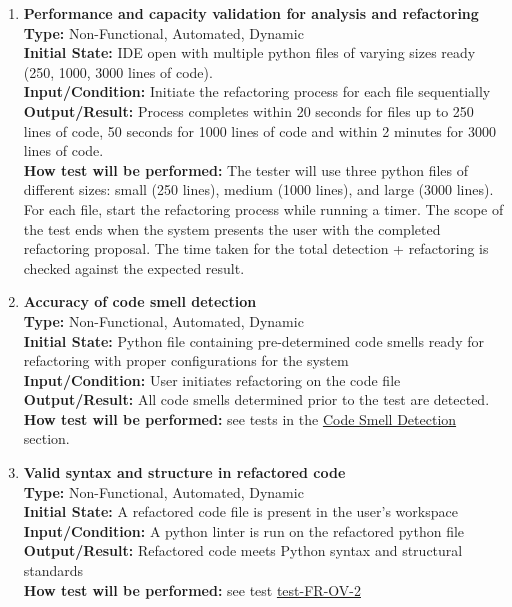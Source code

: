 \documentclass[12pt, titlepage]{article}
\begin{document}
\begin{enumerate}[label={\bf \textcolor{Maroon}{test-PF-\arabic*}}, wide=0pt, font=\itshape]
  \item \textbf{Performance and capacity validation for analysis and refactoring} \\[2mm]
    \textbf{Type:} Non-Functional, Automated, Dynamic \\
    \textbf{Initial State:} IDE open with multiple python files of varying sizes ready (250, 1000, 3000 lines of code). \\
    \textbf{Input/Condition:} Initiate the refactoring process for each file sequentially \\
    \textbf{Output/Result:} Process completes within 20 seconds for files up to 250 lines of code, 50 seconds for 1000 lines of code and within 2 minutes for 3000 lines of code. \\[2mm]
    \textbf{How test will be performed:} The tester will use three python files of different sizes: small (250 lines), medium (1000 lines), and 
    large (3000 lines). For each file, start the refactoring process while running a timer. 
    The scope of the test ends when the system presents the user with the completed refactoring proposal. 
    The time taken for the total detection + refactoring is checked against the expected result.

  \item \textbf{Accuracy of code smell detection} \\[2mm]
    \textbf{Type:} Non-Functional, Automated, Dynamic \\
    \textbf{Initial State:} Python file containing pre-determined code smells ready for refactoring with proper configurations for the system \\
    \textbf{Input/Condition:} User initiates refactoring on the code file \\
    \textbf{Output/Result:} All code smells determined prior to the test are detected. \\[2mm]
    \textbf{How test will be performed:} see tests in the \hyperref[4.1.2]{Code Smell Detection} section.

  \item \textbf{Valid syntax and structure in refactored code} \\[2mm]
    \textbf{Type:} Non-Functional, Automated, Dynamic \\
    \textbf{Initial State:} A refactored code file is present in the user's workspace \\
    \textbf{Input/Condition:} A python linter is run on the refactored python file \\
    \textbf{Output/Result:} Refactored code meets Python syntax and structural standards \\[2mm]
    \textbf{How test will be performed:} see test \hyperref[itm:FR-OV-2]{test-FR-OV-2}


\end{enumerate}
\end{document}
